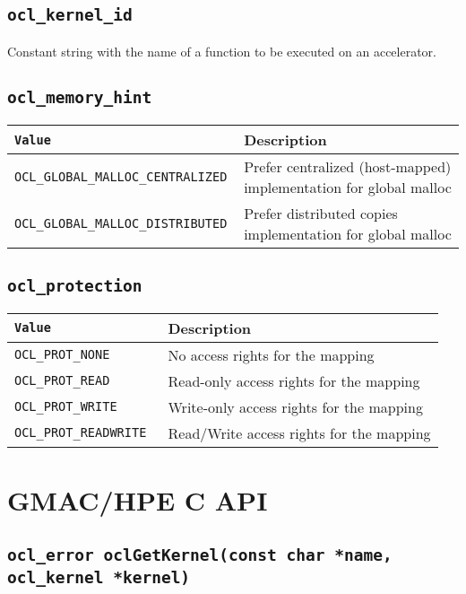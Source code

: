 \subsection{\texttt{ocl\_kernel\_id}}

Constant string with the name of a function to be executed on an accelerator.

\subsection{\texttt{ocl\_memory\_hint}}
\begin{tabularx}{\linewidth}{|>{\texttt\bgroup}l<{\egroup}|X|}
  \hline
  \textnormal{Value} & Description \\
  \hline
  \hline
  OCL\_GLOBAL\_MALLOC\_CENTRALIZED & Prefer centralized (host\hyp{}mapped) implementation for global 
  malloc \\
  OCL\_GLOBAL\_MALLOC\_DISTRIBUTED & Prefer distributed copies implementation for global malloc \\
  \hline
\end{tabularx}


\subsection{\texttt{ocl\_protection}}
\begin{tabularx}{\linewidth}{|>{\texttt\bgroup}l<{\egroup}|X|}
  \hline
  \textnormal{Value} & Description \\
  \hline
  \hline
  OCL\_PROT\_NONE  & No access rights for the mapping \\
  OCL\_PROT\_READ  & Read\hyp{}only access rights for the mapping \\
  OCL\_PROT\_WRITE & Write\hyp{}only access rights for the mapping \\
  OCL\_PROT\_READWRITE & Read\slash{}Write access rights for the mapping \\
  \hline
\end{tabularx}

\section{GMAC\slash HPE C API}

\subsection{\texttt{ocl\_error oclGetKernel(const char *name, ocl\_kernel *kernel)}}

